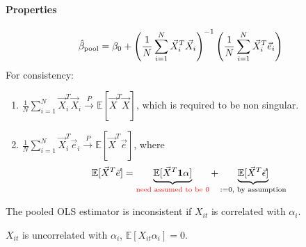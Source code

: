\documentclass[11pt]{elegantbook}
\begin{document}
\paragraph*{Properties}
\begin{equation}
    \begin{aligned}
        \hat{\beta}_\textnormal{pool}=\beta_0+\left(\frac{1}{N}\sum_{i=1}^N \vec{X}_i^T \vec{X}_i\right)^{-1}\left(\frac{1}{N}\sum_{i=1}^N \vec{X}_i^T \vec{e}_i\right)
    \end{aligned}
    \nonumber
\end{equation}
For consistency:
\begin{enumerate}
    \item $\frac{1}{N}\sum_{i=1}^N \vec{X}_i^T \vec{X}_i \stackrel{P}{\longrightarrow} \mathbb{E}[\vec{X}^T \vec{X}]$, which is required to be non singular.
    \item $\frac{1}{N}\sum_{i=1}^N \vec{X}_i^T \vec{e}_i \stackrel{P}{\longrightarrow} \mathbb{E}[\vec{X}^T \vec{e}]$, where
    \begin{equation}
        \begin{aligned}
            \mathbb{E}[\vec{X}^T \vec{e}]=\underbrace{\mathbb{E}[\vec{X}^T \mathbf{1}\alpha]}_{\textcolor{red}{\textnormal{need assumed to be 0}}}+\underbrace{\mathbb{E}[\vec{X}^T \vec{\epsilon}]}_{:=0 \textnormal{, by assumption}}
        \end{aligned}
        \nonumber
    \end{equation}
\end{enumerate}
The pooled OLS estimator is inconsistent if $X_{it}$ is correlated with $\alpha_i$.
\begin{assumption}
    $X_{it}$ is uncorrelated with $\alpha_i$, $\mathbb{E}[X_{it}\alpha_i]=0$.
\end{assumption}
\end{document}
